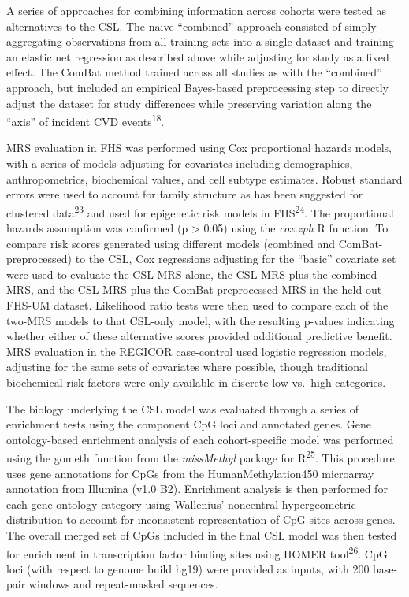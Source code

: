 \documentclass[]{article}
\begin{document}
A series of approaches for combining information across cohorts were
tested as alternatives to the CSL. The naive ``combined'' approach
consisted of simply aggregating observations from all training sets into
a single dataset and training an elastic net regression as described
above while adjusting for study as a fixed effect. The ComBat method
trained across all studies as with the ``combined'' approach, but
included an empirical Bayes-based preprocessing step to directly adjust
the dataset for study differences while preserving variation along the
``axis'' of incident CVD events\textsuperscript{18}.

MRS evaluation in FHS was performed using Cox proportional hazards
models, with a series of models adjusting for covariates including
demographics, anthropometrics, biochemical values, and cell subtype
estimates. Robust standard errors were used to account for family
structure as has been suggested for clustered data\textsuperscript{23}
and used for epigenetic risk models in FHS\textsuperscript{24}. The
proportional hazards assumption was confirmed (p \textgreater{} 0.05)
using the \emph{cox.zph} R function. To compare risk scores generated
using different models (combined and ComBat-preprocessed) to the CSL,
Cox regressions adjusting for the ``basic'' covariate set were used to
evaluate the CSL MRS alone, the CSL MRS plus the combined MRS, and the
CSL MRS plus the ComBat-preprocessed MRS in the held-out FHS-UM dataset.
Likelihood ratio tests were then used to compare each of the two-MRS
models to that CSL-only model, with the resulting p-values indicating
whether either of these alternative scores provided additional
predictive benefit. MRS evaluation in the REGICOR case-control used
logistic regression models, adjusting for the same sets of covariates
where possible, though traditional biochemical risk factors were only
available in discrete low vs.~high categories.

The biology underlying the CSL model was evaluated through a series of
enrichment tests using the component CpG loci and annotated genes. Gene
ontology-based enrichment analysis of each cohort-specific model was
performed using the gometh function from the \emph{missMethyl} package
for R\textsuperscript{25}. This procedure uses gene annotations for CpGs
from the HumanMethylation450 microarray annotation from Illumina (v1.0
B2). Enrichment analysis is then performed for each gene ontology
category using Wallenius' noncentral hypergeometric distribution to
account for inconsistent representation of CpG sites across genes. The
overall merged set of CpGs included in the final CSL model was then
tested for enrichment in transcription factor binding sites using HOMER
tool\textsuperscript{26}. CpG loci (with respect to genome build hg19)
were provided as inputs, with 200 base-pair windows and repeat-masked
sequences.
\end{document}
